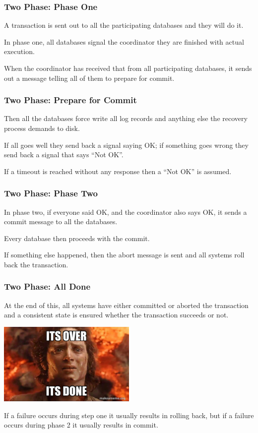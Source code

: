 \begin{frame}
\frametitle{Two Phase: Phase One}

A transaction is sent out to all the participating databases and they will do it.

In phase one, all databases signal the coordinator they are finished with actual execution.

When the coordinator has received that from all participating databases, it sends out a message telling all of them to prepare for commit.


\end{frame}

\begin{frame}
\frametitle{Two Phase: Prepare for Commit}

Then all the databases force write all log records and anything else the recovery process demands to disk. 

If all goes well they send back a signal saying OK; if something goes wrong they send back a signal that says ``Not OK''. 

If a timeout is reached without any response then a ``Not OK'' is assumed.

\end{frame}

\begin{frame}
\frametitle{Two Phase: Phase Two}

In phase two, if everyone said OK, and the coordinator also says OK, it sends a commit message to all the databases. 

Every database then proceeds with the commit. 

If something else happened, then the abort message is sent and all systems roll back the transaction. 

\end{frame}


\begin{frame}
\frametitle{Two Phase: All Done}

At the end of this, all systems have either committed or aborted the transaction and a consistent state is ensured whether the transaction succeeds or not. 

\begin{center}
	\includegraphics[width=0.5\textwidth]{images/overdone.jpg}
\end{center}

If a failure occurs during step one it usually results in rolling back, but if a failure occurs during phase 2 it usually results in commit.

\end{frame}

